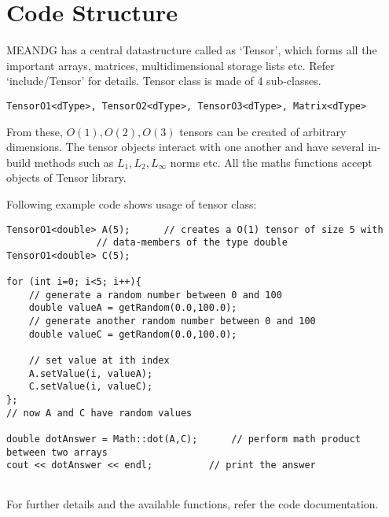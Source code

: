 \chapter{Code Structure}\label{structure}

MEANDG has a central datastructure called as `Tensor', which forms all the important arrays, matrices, multidimensional storage lists etc.
Refer `include/Tensor' for details. Tensor class is made of 4 sub-classes. 
\begin{verbatim}
TensorO1<dType>, TensorO2<dType>, TensorO3<dType>, Matrix<dType>
\end{verbatim}
From these, $O(1), O(2), O(3)$ tensors can be created of arbitrary dimensions. The tensor objects interact with one another and 
have several in-build methods such as $L_1, L_2, L_\infty$ norms etc. All the maths functions accept objects of Tensor library. 

Following example code shows usage of tensor class:
\begin{verbatim}
TensorO1<double> A(5);		// creates a O(1) tensor of size 5 with 
				// data-members of the type double
TensorO1<double> C(5);

for (int i=0; i<5; i++){
	// generate a random number between 0 and 100
	double valueA = getRandom(0.0,100.0);	
	// generate another random number between 0 and 100
	double valueC = getRandom(0.0,100.0);	

	// set value at ith index
	A.setValue(i, valueA);			
	C.setValue(i, valueC);
};
// now A and C have random values 

double dotAnswer = Math::dot(A,C);		// perform math product between two arrays
cout << dotAnswer << endl;			// print the answer


\end{verbatim}

For further details and the available functions, refer the code documentation.
